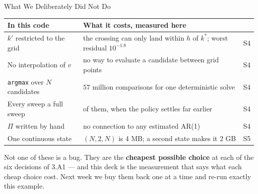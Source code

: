 \begin{frame}{What We Deliberately Did Not Do}
\renewcommand{\arraystretch}{1.18}
\begin{center}\footnotesize
\begin{tabularx}{\linewidth}{@{}>{\raggedright\arraybackslash}p{3.1cm} >{\raggedright\arraybackslash}X c@{}}
\toprule
\textbf{In this code} & \textbf{What it costs, measured here} & \\
\midrule
$k'$ restricted to the grid & the crossing can only land within $h$ of $k^{*}$; worst residual $10^{-1.8}$ & S4 \\
No interpolation of $v$ & no way to evaluate a candidate between grid points & S4 \\
\texttt{argmax} over $N$ candidates & $57$ million comparisons for one deterministic solve & S4 \\
Every sweep a full sweep & 228 of them, when the policy settles far earlier & S4 \\
$\Pi$ written by hand & no connection to any estimated AR(1) & S4 \\
One continuous state & $(N,2,N)$ is 4 MB; a second state makes it 2 GB & S5 \\
\bottomrule
\end{tabularx}
\end{center}
\vspace{1mm}
\begin{takeawaybox}\small
Not one of these is a bug. They are the \textbf{cheapest possible choice} at each of the six decisions of 3.A1 --- and this deck is the measurement that says what each cheap choice cost. Next week we buy them back one at a time and re-run exactly this example.
\end{takeawaybox}
\end{frame}

